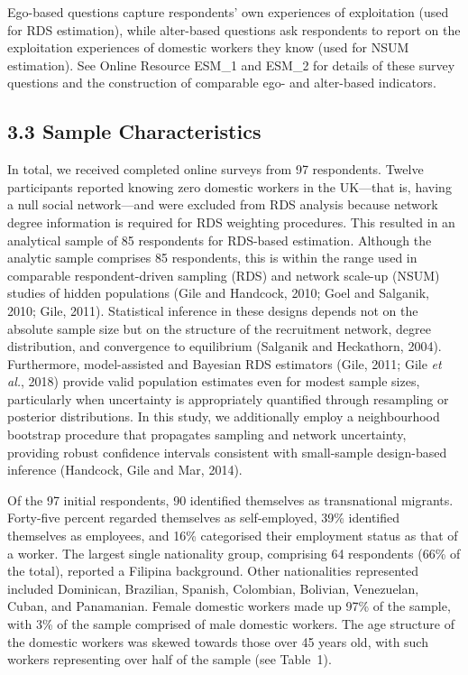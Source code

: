 \documentclass[
  12pt,
  letterpaper,
  DIV=11,
  numbers=noendperiod]{scrartcl}
\begin{document}
Ego-based questions capture respondents' own experiences of exploitation
(used for RDS estimation), while alter-based questions ask respondents
to report on the exploitation experiences of domestic workers they know
(used for NSUM estimation). See Online Resource ESM\_1 and ESM\_2 for
details of these survey questions and the construction of comparable
ego- and alter-based indicators.

\subsection{3.3 Sample Characteristics}\label{sample-characteristics}

In total, we received completed online surveys from 97 respondents.
Twelve participants reported knowing zero domestic workers in the
UK---that is, having a null social network---and were excluded from RDS
analysis because network degree information is required for RDS
weighting procedures. This resulted in an analytical sample of 85
respondents for RDS-based estimation. Although the analytic sample
comprises 85 respondents, this is within the range used in comparable
respondent-driven sampling (RDS) and network scale-up (NSUM) studies of
hidden populations (Gile and Handcock, 2010; Goel and Salganik, 2010;
Gile, 2011). Statistical inference in these designs depends not on the
absolute sample size but on the structure of the recruitment network,
degree distribution, and convergence to equilibrium (Salganik and
Heckathorn, 2004). Furthermore, model-assisted and Bayesian RDS
estimators (Gile, 2011; Gile \emph{et al.}, 2018) provide valid
population estimates even for modest sample sizes, particularly when
uncertainty is appropriately quantified through resampling or posterior
distributions. In this study, we additionally employ a neighbourhood
bootstrap procedure that propagates sampling and network uncertainty,
providing robust confidence intervals consistent with small-sample
design-based inference (Handcock, Gile and Mar, 2014).

Of the 97 initial respondents, 90 identified themselves as transnational
migrants. Forty-five percent regarded themselves as self-employed, 39\%
identified themselves as employees, and 16\% categorised their
employment status as that of a worker. The largest single nationality
group, comprising 64 respondents (66\% of the total), reported a
Filipina background. Other nationalities represented included Dominican,
Brazilian, Spanish, Colombian, Bolivian, Venezuelan, Cuban, and
Panamanian. Female domestic workers made up 97\% of the sample, with 3\%
of the sample comprised of male domestic workers. The age structure of
the domestic workers was skewed towards those over 45 years old, with
such workers representing over half of the sample (see Table~1).
\end{document}
